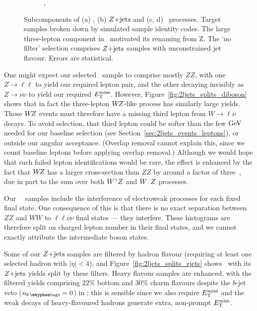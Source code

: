 \begin{figure}[tp]
\begin{subfigure}{0.495\textwidth}
\caption{\srllbb, \topother}
\label{fig:2ljets_splits_topother2}
\end{subfigure}
\caption[
Subcomponents of \diboson, $\zjets$ and rare-top processes.
]{%
Subcomponents of (a) \diboson, (b) $\zjets$ and (c, d) \topother\ processes.
Target samples broken down by simulated sample identity codes.
The large three-lepton component in \crvz\ motivated its renaming from \crz Z.
The `no filter' selection comprises $\zjets$ samples with unconstrained jet
flavour.
Errors are statistical.
}
\label{fig:2ljets_splits}
\end{figure}

One might expect our selected \diboson\ sample to comprise mostly
$ZZ$, with one $Z\to \ell\ell$ to yield our required lepton pair, and the other
decaying invisibly as $Z\to \nu\nu$ to yield our required $\met$.
However, Figure~\ref{fig:2ljets_splits_diboson} shows that in fact the
three-lepton $W\kern-0.4exZ$-like process has similarly large yields.
Those $W\kern-0.4exZ$ events must therefore have a missing third lepton from
$W\to \ell\nu$ decays.
To avoid selection, that third lepton could be softer than the few $\eV[G]$
needed for our baseline selection
(see Section~\ref{sec:2ljets_events_leptons}),
or outside our angular acceptance.
(Overlap removal cannot explain this, since we count baseline leptons before
applying overlap removal.)
Although we would hope that such failed lepton identifications would be rare,
the effect is enhanced by the fact that $W\kern-0.4exZ$ has a larger
cross-section than $ZZ$ by around a factor of three~\cite{Campbell:2011bn},
due in part to the sum over both $W^+\kern-0.4exZ$ and $W^-\kern-0.4exZ$
processes.

Our \sherpa\ \diboson\ samples include the interference of electroweak
processes for each fixed final state.
One consequence of this is that there is no exact separation between $ZZ$ and
$WW$ to $\ell\ell\nu\nu$ final states --- they interfere.
These histograms are therefore split on charged lepton number in their
final states, and we cannot exactly attribute the intermediate boson states.

Some of our $\zjets$ samples are filtered by hadron flavour
(requiring at least one selected hadron with $|\eta| < 4$), and
Figure~\ref{fig:2ljets_splits_zjets} shows \crz\ with its $\zjets$ yields
split by these filters.
Heavy flavour samples are enhanced, with the filtered yields comprising
$22\%$ bottom and $30\%$ charm flavours despite the $b$-jet veto ($\nbtag = 0$)
in \crz;
this is sensible since we also require $\met$ and the weak decays of
heavy-flavoured hadrons generate extra, non-prompt $\met$.

